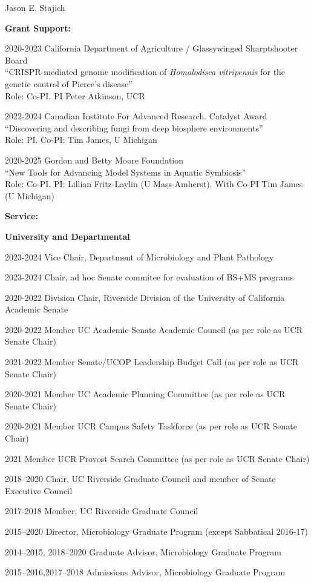 \documentclass[10pt]{article}
\begin{document}
\begin{cv}{\centerline{Jason E. Stajich}}
\begin{cvlistcompact}{\bf Grant Support:}
\item [2020-2023] California Department of Agriculture / Glassywinged Sharptshooter Board  \\
``CRISPR-mediated genome modification of \textit{Homalodisca vitripennis} for the genetic control of Pierce's disease'' \\
Role: Co-PI. PI Peter Atkinson, UCR

\item [2022-2024] Canadian Institute For Advanced Research. Catalyst Award \\
  ``Discovering and describing fungi from deep biosphere environments'' \\
Role: PI. Co-PI: Tim James, U Michigan

\item [2020-2025] Gordon and Betty Moore Foundation \\
  ``New Tools for Advancing Model Systems in Aquatic Symbiosis''  \\
Role: Co-PI. PI: Lillian Fritz-Laylin (U Mass-Amherst). With Co-PI Tim James (U Michigan)

\end{cvlistcompact}

\setlength{\cvlabelwidth}{18mm}

\begin{cvlistcompact}{\bf Service:}
\item[{\bf University and Departmental}]
\item [2023-2024] Vice Chair, Department of Microbiology and Plant Pathology
\item [2023-2024]  Chair, ad hoc Senate commitee for evaluation of BS+MS programs
\item [2020-2022] Division Chair, Riverside Division of the University of California Academic Senate
\item [2020-2022] Member UC Academic Senate Academic Council (as per role as UCR Senate Chair)
\item [2021-2022] Member Senate/UCOP Leadership Budget Call (as per role as UCR Senate Chair)
\item [2020-2021] Member UC Academic Planning Committee (as per role as UCR Senate Chair)
\item [2020-2021] Member UCR Campus Safety Taskforce (as per role as UCR Senate Chair)
\item [2021] Member UCR Provost Search Committee (as per role as UCR Senate Chair)
\item [2018--2020] Chair, UC Riverside Graduate Council and member of Senate Executive Council
\item [2017-2018] Member, UC Riverside Graduate Council
\item [2015--2020] Director, Microbiology Graduate Program (except Sabbatical 2016-17)
\item [2014--2015, 2018--2020] Graduate Advisor, Microbiology Graduate Program
\item [2015--2016,2017--2018] Admissions Advisor, Microbiology Graduate Program
\\


\end{cvlistcompact}
\end{cv}
\end{document}
